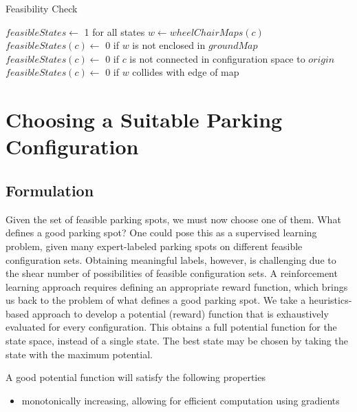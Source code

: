 \begin{algorithm}
\caption{Feasibility Check}
\label{alg:feasibilitycheck}
\begin{algorithmic}[1]
\Statex
{}
    \State $feasibleStates \gets$ 1 for all states
        \State $w \gets wheelChairMaps(c)$
        \State $feasibleStates(c) \gets$ 0 if $w$ is not enclosed in $groundMap$
        \State $feasibleStates(c) \gets$ 0 if $c$ is not connected in configuration space to $origin$
        \State $feasibleStates(c) \gets$ 0 if $w$ collides with edge of map
    \EndFor
\EndFunction
\Statex
{}
\end{algorithmic}
\end{algorithm}

\section{Choosing a Suitable Parking Configuration}
\label{sec:choosingparkingspot}
\subsection{Formulation}
Given the set of feasible parking spots, we must now choose one of them. What
defines a good parking spot? One could pose this as a supervised learning
problem, given many expert-labeled parking spots on different feasible
configuration sets.  Obtaining meaningful labels, however, is challenging due to
the shear number of possibilities of feasible configuration sets. A
reinforcement learning approach requires defining an appropriate reward
function, which brings us back to the problem of what defines a good parking
spot. We take a heuristics-based approach to develop a potential (reward)
function that is exhaustively evaluated for every configuration.
This obtains a full potential function for the state space, instead of a single
state. The best state may be chosen by taking the state with the maximum
potential.

A good potential function will satisfy the following properties
\begin{itemize}
\item monotonically increasing, allowing for efficient computation
using gradients
\end{itemize}

